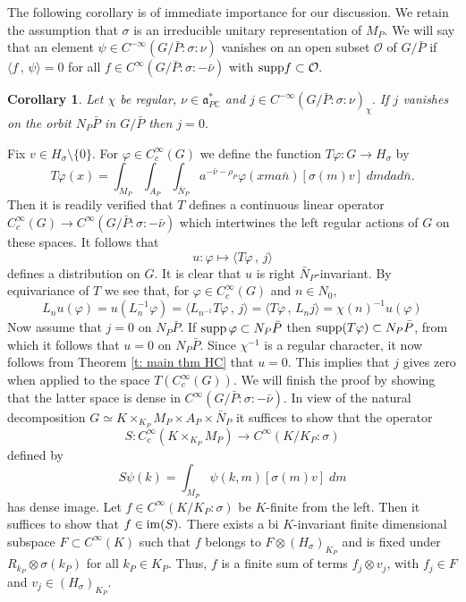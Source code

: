 \documentclass[12pt,a4paper]{article}
\newtheorem{Cor}[Thm]{Corollary}
\newenvironment{cor}[0]{\begin{Cor}\noindent}%
{\end{Cor}}
\def\proof{\par\noindent{\it Proof.}{\ }{\ }}
\def\msy#1{{\mathbb #1}}
\def\C{{\msy C}}
\def\gf{\varphi}
\def\gs{\sigma}
\def\got#1{\mathfrak #1}
\def\fa{{\got a}}
\def\to{\rightarrow}
\def\inp#1#2{\langle#1\,,\,#2\rangle}
\def\iC{{\scriptscriptstyle \C}}
\def\cO{{\mathcal O}}
\numberwithin{Thm}{section}
\numberwithin{equation}{section}
\def\supp{{\rm supp}}
\def\faPdc{{\fa_{P\iC}^*}}
\numberwithin{equation}{section}
\def\faPdc{\fa_{P\iC}^*}
\def\cchi{\chi}
\begin{document}
The following corollary is of immediate importance for our discussion.
We retain the assumption that $\gs$ is an irreducible unitary representation of $M_P.$ 
We will say that an element $\psi \in C^{-\infty}(G/\bar P:\gs:\nu)$ vanishes 
on an open subset $\cO$ of $G/\bar P$ if $\inp{f}{\psi} = 0$ 
for all $f \in C^\infty(G/\bar P:\gs: -\bar\nu)$ with $\supp f \subset \cO.$ 
\begin{cor}
\label{c: cor of main thm HC}
Let $\cchi$ be regular, $\nu \in \faPdc$ and $j \in C^{-\infty}(G/\bar P: \gs: \nu)_\cchi.$ 
If $j$ vanishes on the orbit $N_P\bar P$ in $G/\bar P$ then $j =0.$ 
\end{cor}

%
\proof 
Fix $v \in H_\gs\setminus \{0\}.$ For $\gf \in C_c^\infty(G)$ we define 
the function $T \gf: G \to H_\gs$ by 
$$ 
T\gf(x) = \int_{M_P} \int_{A_P} \int_{\bar N_P} a^{-\bar \nu - \rho_P} \gf(xma\bar n)  
[\gs(m)v] \; dm da d\bar n.
$$%
Then it is readily verified that $T$ defines a continuous linear operator
$C_c^\infty(G) \to C^\infty(G/\bar P:\gs: -\bar \nu)$ which intertwines
the left regular actions of $G$ on these spaces. It follows that
$$ 
u: \gf \mapsto \inp{T\gf}{j}
$$%
defines a distribution on $G.$ It is clear that $u$ is right $\bar N_P$-invariant.
By equivariance of $T$ we see that, for $\gf \in C^\infty_c(G)$ and  $n \in N_0,$ 
$$ 
    L_{n}u(\gf) =  u(L_n^{-1} \gf) = \inp{L_{n^{-1}}T\gf}j = \inp{T\gf}{L_n j}
=
\cchi(n)^{-1} u(\gf) 
$$%
Now assume that $j =0$ on $N_P \bar P.$ 
If $\supp\, \gf \subset N_P \bar P$ then $\supp (T\gf)
\subset N_P \bar P$, from which it follows that $u = 0$ 
on $N_P \bar P.$ Since $\chi^{-1}$ is a regular character, it now follows from 
Theorem \ref{t: main thm HC} that
$u = 0.$ This implies that $j$ gives zero when applied to the space $T(C_c^\infty(G)).$ We will finish the proof by showing that the latter space is dense in $C^\infty(G/\bar P:\gs:-\bar \nu).$ 
In view of the natural decomposition $G \simeq K\times_{K_P} M_P \times A_P \times \bar N_P$ it suffices to show that the operator 
$$
S: C^\infty_c(K \times_{K_P} M_P) \to C^\infty(K/K_P: \gs)
$$%
defined by 
$$ 
S\psi(k) = \int_{M_P}  \psi(k,m) [\gs(m)v]\; dm
$$%
has dense image. Let $f \in C^\infty(K/K_P: \gs)$ be $K$-finite from 
the left. Then it suffices to show that $f \in {\rm im}(S).$  There exists
a bi $K$-invariant finite dimensional subspace $F \subset C^\infty(K)$ such that 
$f$ belongs to $F \otimes (H_\gs)_{K_P}$ and is fixed under $R_{k_P}\otimes \gs(k_P)$ 
for all $k_P\in K_P.$  Thus, $f$ is a finite sum of terms
$f_j \otimes v_j$, with $f_j \in F$ and $v_j \in (H_\gs)_{K_P}.$ 
\end{document}
